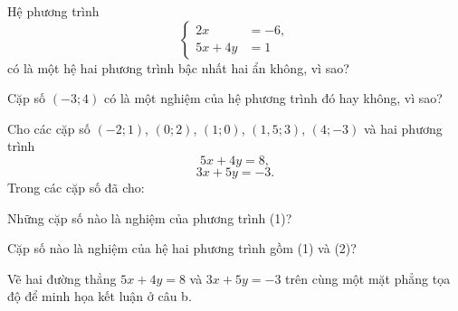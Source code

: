 \begin{exercises}
\begin{questions}[series=SGK]
        \item
        \begin{questions}
            \item Hệ phương trình
            \[
                \left\{
                \begin{aligned}
                    2x&=-6,\\
                    5x+4y&=1
                \end{aligned}
                \right.
            \]
            có là một hệ hai phương trình bậc nhất hai ẩn không, vì sao?
            \item Cặp số $(-3;4)$ có là một nghiệm của hệ phương trình đó hay không, vì sao?
        \end{questions}
        \answerline
        \answerline

        \item Cho các cặp số $(-2;1)$, $(0;2)$, $(1;0)$, $(1{,}5;3)$, $(4;-3)$ và hai phương trình
        \[
            5x+4y=8, \tag{1}
        \]
        \[
            3x+5y=-3. \tag{2}
        \]
        Trong các cặp số đã cho:
        \begin{questions}
            \item Những cặp số nào là nghiệm của phương trình (1)?
            \item Cặp số nào là nghiệm của hệ hai phương trình gồm (1) và (2)?
            \item Vẽ hai đường thẳng $5x+4y=8$ và $3x+5y=-3$ trên cùng một mặt phẳng tọa độ để minh họa kết luận ở câu b.
        \end{questions}
        \answerline
        \answerline
        \answerline
    \end{questions}
\end{exercises}

